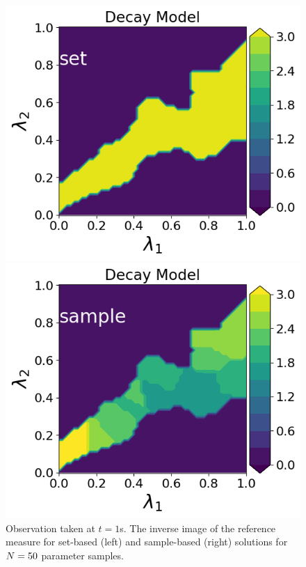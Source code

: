 \begin{figure}
\begin{minipage}{.475\textwidth}
\includegraphics[width=\linewidth]{examples/fig_decay_q1/DecayModel--set_N50_em.png}
\end{minipage}
\begin{minipage}{.475\textwidth}
\includegraphics[width=\linewidth]{examples/fig_decay_q1/DecayModel--sample_N50_mc.png}
\end{minipage}
\caption{Observation taken at $t=1$s. The inverse image of the reference measure for set-based (left) and sample-based (right) solutions for $N=50$ parameter samples.}
\label{fig:heatrod-sol-ex1}
\end{figure}

